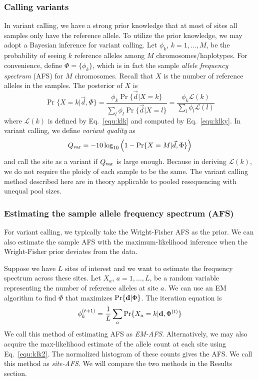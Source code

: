 \documentclass{bioinfo}
\begin{document}
\begin{methods}
\subsubsection{Calling variants}
In variant calling, we have a strong prior knowledge that at most of sites all
samples only have the reference allele.  To utilize the prior knowledge, we
may adopt a Bayesian inference for variant calling.  Let $\phi_k$, $k=1,\ldots,M$,
be the probability of seeing $k$ reference alleles among $M$
chromosomes/haplotypes. For convenience, define $\Phi=\{\phi_k\}$, which is in
fact the sample \emph{allele frequency spectrum} (AFS) for $M$ chromosomes.
Recall that $X$ is the number of reference alleles in the samples. The posterior of
$X$ is
\begin{equation}\label{eq:post}
\Pr\{X=k|\vec{d},\Phi\}=\frac{\phi_k\Pr\{\vec{d}|X=k\}}{\sum_l\phi_l\Pr\{\vec{d}|X=l\}}
=\frac{\phi_k\mathcal{L}(k)}{\sum_l\phi_l\mathcal{L}(l)}
\end{equation}
where $\mathcal{L}(k)$ is defined by Eq.~\eqref{equ:klk} and computed by
Eq.~\eqref{equ:klky}.  In variant calling, we define \emph{variant quality} as
$$
Q_{\rm var}=-10\log_{10}\Big(1-\Pr\{X=M|\vec{d},\Phi\}\Big)
$$
and call the site as a variant if $Q_{\rm var}$ is large enough. Because in
deriving $\mathcal{L}(k)$, we do not require the ploidy of each sample to be
the same. The variant calling method described here are in theory applicable to
pooled resequencing with unequal pool sizes.

\subsubsection{Estimating the sample allele frequency spectrum (AFS)}
For variant calling, we typically take the Wright-Fisher AFS as the prior. We
can also estimate the sample AFS with the maximum-likelihood inference when the
Wright-Fisher prior deviates from the data.

Suppose we have $L$ sites of interest and we want to estimate the frequency
spectrum across these sites.  Let $X_a$, $a=1,\ldots,L$, be a random variable
representing the number of reference alleles at site $a$. We can use an EM
algorithm to find $\Phi$ that maximizes
$\Pr\{{\bf d}|\Phi\}$. The iteration equation is
\begin{equation}\label{eq:afs}
\phi_k^{(t+1)}=\frac{1}{L}\sum_a\Pr\{X_a=k|{\bf d},\Phi^{(t)}\}
\end{equation}
We call this method of estimating AFS as \emph{EM-AFS}. Alternatively, we may
also acquire the max-likelihood estimate of the allele count at each site using
Eq.~\eqref{equ:klk2}. The normalized histogram of these counts gives the AFS.
We call this method as \emph{site-AFS}. We will compare the two methods in the
Results section.


\end{methods}
\end{document}
